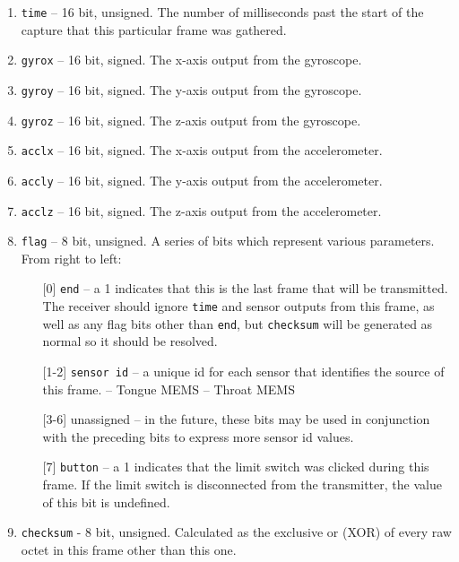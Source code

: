 \documentclass{article}
\begin{document}
            \begin{enumerate}
                \item \texttt{time} -- 16 bit, unsigned. The number of milliseconds past the start of the capture that this particular frame was gathered.
                \item \texttt{gyro\textunderscore x} -- 16 bit, signed. The x-axis output from the gyroscope.
                \item \texttt{gyro\textunderscore y} -- 16 bit, signed. The y-axis output from the gyroscope.
                \item \texttt{gyro\textunderscore z} -- 16 bit, signed. The z-axis output from the gyroscope.
                \item \texttt{accl\textunderscore x} -- 16 bit, signed. The x-axis output from the accelerometer.
                \item \texttt{accl\textunderscore y} -- 16 bit, signed. The y-axis output from the accelerometer.
                \item \texttt{accl\textunderscore z} -- 16 bit, signed. The z-axis output from the accelerometer.
                \item \texttt{flag} -- 8 bit, unsigned. A series of bits which represent various parameters. From right to left:
                \begin{itemize}
                    \item[] [0] \texttt{end} -- a 1 indicates that this is the last frame that will be transmitted. The receiver should ignore \texttt{time} and sensor outputs from this frame, as well as any flag bits other than \texttt{end}, but \texttt{checksum} will be generated as normal so it should be resolved.
                    \item[] [1-2] \texttt{sensor id} -- a unique id for each sensor that identifies the source of this frame.
                     -- Tongue MEMS
                     -- Throat MEMS
                    \item[] [3-6] unassigned -- in the future, these bits may be used in conjunction with the preceding bits to express more sensor id values.
                    \item[] [7] \texttt{button} -- a 1 indicates that the limit switch was clicked during this frame. If the limit switch is disconnected from the transmitter, the value of this bit is undefined.
                \end{itemize}
                \item \texttt{checksum} - 8 bit, unsigned. Calculated as the exclusive or (XOR) of every raw octet in this frame other than this one.
            \end{enumerate}
        
\end{document}
